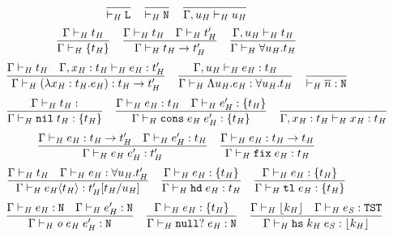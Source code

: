 \begin{figure}[p]
\[
\frac
{}
{ \vdash_{\mathit{H}} \mathtt{L}}
\quad
\frac
{}
{ \vdash_{\mathit{H}} \mathtt{N}}
\quad
\frac
{}
{\Gamma , u_{\mathit{H}} \vdash_{\mathit{H}} u_{\mathit{H}}}
\]
\[
\frac
{\Gamma \vdash_{\mathit{H}} t_{\mathit{H}}}
{\Gamma \vdash_{\mathit{H}} \lbrace t_{\mathit{H}} \rbrace}
\quad
\frac
{\Gamma \vdash_{\mathit{H}} t_{\mathit{H}} \quad \Gamma \vdash_{\mathit{H}} t_{\mathit{H}}'}
{\Gamma \vdash_{\mathit{H}} t_{\mathit{H}} \rightarrow t_{\mathit{H}}'}
\quad
\frac
{\Gamma, u_{\mathit{H}} \vdash_{\mathit{H}} t_{\mathit{H}}}
{\Gamma \vdash_{\mathit{H}} \forall u_{\mathit{H}} . t_{\mathit{H}}}
\]
\bigskip
\[
\frac
{\Gamma \vdash_{\mathit{H}} t_{\mathit{H}} \quad \Gamma , x_{\mathit{H}} : t_{\mathit{H}} \vdash_{\mathit{H}} e_{\mathit{H}} : t_{\mathit{H}}'}
{\Gamma \vdash_{\mathit{H}} (\lambda x_{\mathit{H}} : t_{\mathit{H}} . e_{\mathit{H}}) : t_{\mathit{H}} \rightarrow t_{\mathit{H}}'}
\quad
\frac
{\Gamma , u_{\mathit{H}} \vdash_{\mathit{H}} e_{\mathit{H}} : t_{\mathit{H}}}
{\Gamma \vdash_{\mathit{H}} \Lambda u_{\mathit{H}} . e_{\mathit{H}} : \forall u_{\mathit{H}} . t_{\mathit{H}}}
\quad
\frac
{}
{ \vdash_{\mathit{H}} \overline{n} : \mathtt{N}}
\]
\[
\frac
{\judeh{\env}{\vartyh}}
{\judeh{\env}{\expnils{\vartyh}}{\tylist{\vartyh}}}
\quad
\frac
{\judeh{\env}{\first{\varexph}}{\vartyh} \quad \judeh{\env}{\second{\varexph}}{\tylist{\vartyh}}}
{\judeh{\env}{\expcons{\first{\varexph}}{\second{\varexph}}}{\tylist{\vartyh}}}
\quad
\frac
{}
{\judeh{\envexte{\varvarh}{\vartyh}}{\varvarh}{\vartyh}}
\]
\[
\frac
{\Gamma \vdash_{\mathit{H}} e_{\mathit{H}} : t_{\mathit{H}} \rightarrow t_{\mathit{H}}' \quad \Gamma \vdash_{\mathit{H}} e_{\mathit{H}}' : t_{\mathit{H}}}
{\Gamma\vdash_{\mathit{H}}e_{\mathit{H}} \; e_{\mathit{H}}':t_{\mathit{H}}'}
\quad
\frac
{\Gamma \vdash_{\mathit{H}} e_{\mathit{H}} : t_{\mathit{H}} \rightarrow t_{\mathit{H}}}
{\Gamma \vdash_{\mathit{H}} \mathtt{fix} \; e_{\mathit{H}} : t_{\mathit{H}}}
\]
\[
\frac
{\Gamma \vdash_{\mathit{H}} t_{\mathit{H}} \quad \Gamma \vdash_{\mathit{H}} e_{\mathit{H}} : \forall u_{\mathit{H}} . t_{\mathit{H}}'}
{\Gamma \vdash_{\mathit{H}} e_{\mathit{H}} \langle t_{\mathit{H}} \rangle : t_{\mathit{H}}'[t_{\mathit{H}}/u_{\mathit{H}}]}
\quad
\frac
{\Gamma \vdash_{\mathit{H}} e_{\mathit{H}} : \lbrace t_{\mathit{H}} \rbrace}
{\Gamma \vdash_{\mathit{H}} \mathtt{hd} \; e_{\mathit{H}} : t_{\mathit{H}}}
\quad
\frac
{\Gamma \vdash_{\mathit{H}} e_{\mathit{H}} : \lbrace t_{\mathit{H}} \rbrace}
{\Gamma \vdash_{\mathit{H}} \mathtt{tl} \; e_{\mathit{H}} : \lbrace t_{\mathit{H}} \rbrace}
\]
\[
\frac
{\Gamma \vdash_{\mathit{H}} e_{\mathit{H}} : \mathtt{N} \quad \Gamma \vdash_{\mathit{H}} e_{\mathit{H}}' : \mathtt{N}}
{\Gamma \vdash_{\mathit{H}} \mathit{o} \; e_{\mathit{H}} \; e_{\mathit{H}}' : \mathtt{N}}
\quad
\frac
{\Gamma \vdash_{\mathit{H}} e_{\mathit{H}} : \lbrace t_{\mathit{H}} \rbrace}
{\Gamma \vdash_{\mathit{H}} \mathtt{null?} \; e_{\mathit{H}} : \mathtt{N}}
\quad
\frac
{\Gamma \vdash_{\mathit{H}} \lfloor k_{\mathit{H}} \rfloor \quad \Gamma \vdash_{\mathit{H}} e_{\mathit{S}} : \mathtt{TST}}
{\Gamma \vdash_{\mathit{H}} \mathtt{hs} \; k_{\mathit{H}} \; e_{\mathit{S}} : \lfloor k_{\mathit{H}} \rfloor}
\]
\end{figure}

